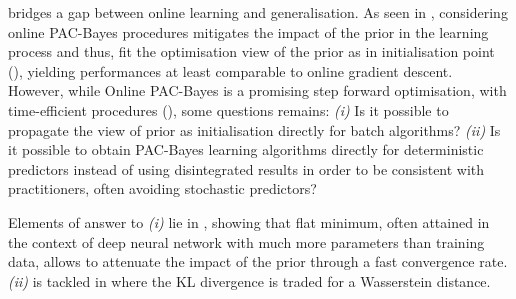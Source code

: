   bridges a gap between online learning and generalisation. As seen in , considering online PAC-Bayes procedures mitigates the impact of the prior in the learning process and thus, fit the optimisation view of the prior as in initialisation point (), yielding performances at least comparable to online gradient descent. 
However, while Online PAC-Bayes is a promising step forward optimisation, with time-efficient procedures (), some questions remains: \textit{(i)} Is it possible to propagate the view of prior as initialisation directly for batch algorithms? \textit{(ii)} Is it possible to obtain PAC-Bayes learning algorithms directly for deterministic predictors instead of using disintegrated results in order to be consistent with practitioners, often avoiding stochastic predictors?

 Elements of answer to \textit{(i)} lie in , showing that flat minimum, often attained in the context of deep neural network with much more parameters than training data, allows to attenuate the impact of the prior through a fast convergence rate. \textit{(ii)} is tackled in  where the KL divergence is traded for a Wasserstein distance. 


